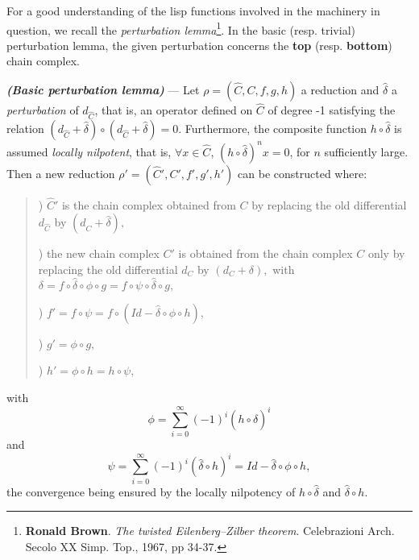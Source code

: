For a good understanding of the lisp functions involved in the machinery in question,
we recall the {\em perturbation lemma}\footnote{{\bf Ronald Brown}. {\em The twisted Eilenberg--Zilber theorem}.
Celebrazioni Arch. Secolo XX Simp. Top., 1967, pp 34-37.}. In the basic (resp. trivial) perturbation lemma,
the given perturbation concerns the {\bf top} (resp. {\bf bottom}) chain complex.

\begin{thr}
{\em \bf (Basic perturbation lemma)} --- Let
$\rho=(\hat{C},C,f,g,h)$ a reduction and $\hat{\delta}$ a {\em perturbation} of
$d_{\hat{C}}$, that is, an operator defined on $\hat{C}$ of degree -1 satisfying
the relation $(d_{\hat{C}}+\hat{\delta})\circ(d_{\hat{C}}+\hat{\delta})=0$.
Furthermore, the composite function $h\circ\hat{\delta}$ is assumed {\em
locally nilpotent}, that is, $\forall x \in \hat{C}$,
$(h\circ\hat{\delta})^nx=0$, for $n$ sufficiently large. Then a new reduction
$\rho'=(\hat{C}',C',f',g',h')$ can be constructed where:
\begin{quotation}

) $\hat{C}'$ is the chain complex obtained from $C$ by replacing the old
differential $d_{\hat{C}}$ by $(d_{\hat{C}}+\hat{\delta}),$

) the new chain complex $C'$ is obtained from the chain complex $C$ only by
replacing  the old differential $d_C$ by $(d_C + \delta),$
with $\delta = f \circ {\hat \delta} \circ \phi \circ g =
               f \circ \psi \circ {\hat \delta} \circ g,$

) $f'= f \circ \psi = f \circ (Id - {\hat \delta} \circ \phi \circ h),$

) $g'= \phi \circ g,$

) $h'= \phi \circ h = h \circ \psi$,
\end{quotation}
with
$$\phi=\sum_{i=0}^{\infty}{(-1)^i(h \circ  \hat{\delta})^i}$$
and
$$\psi=\sum_{i=0}^{\infty}{(-1)^i(\hat{\delta}\circ h)^i} = Id - {\hat \delta} \circ \phi \circ h,$$
the convergence being ensured by the locally nilpotency of
$h \circ \hat{\delta}$ and $\hat{\delta} \circ h$.
\end{thr}
\vskip 0.45cm
